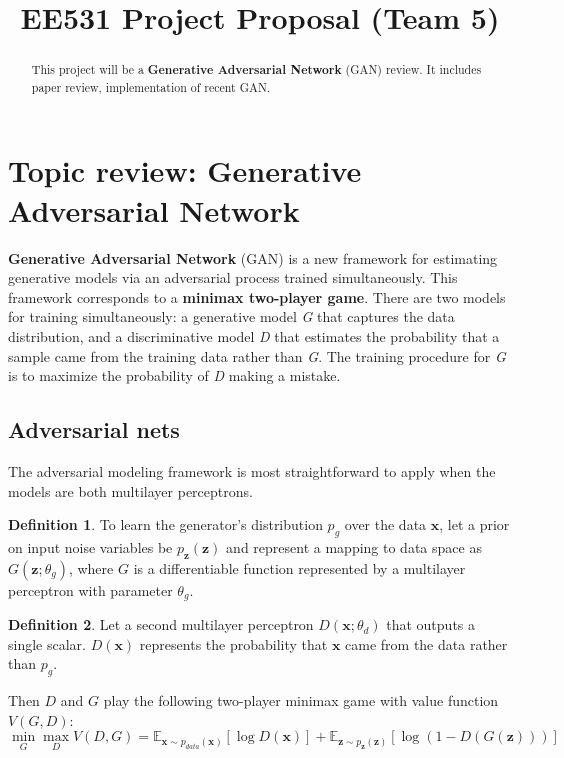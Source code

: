 \documentclass{article} %
\title{EE531 Project Proposal (Team 5)}
\theoremstyle{definition}
\newtheorem{definition}{Definition}
\begin{document}
\maketitle

\begin{abstract}
This project will be a \textbf{Generative Adversarial Network} (GAN) review. It includes paper review, implementation of recent GAN.
\end{abstract}

\section{Topic review: Generative Adversarial Network}
\textbf{Generative Adversarial Network} (GAN) is a new framework \cite{goodfellow2014generative} for estimating generative models via an adversarial process trained simultaneously. This framework corresponds to a \textbf{minimax two-player game}. There are two models for training simultaneously: a generative model \textit{G} that captures the data distribution, and a discriminative model \textit{D} that estimates the probability that a sample came from the training data rather than \textit{G}. The training procedure for \textit{G} is to maximize the probability of \textit{D} making a mistake. 

\subsection{Adversarial nets}

The adversarial modeling framework is most straightforward to apply when the models are both multilayer perceptrons. 

\begin{definition}
To learn the generator's distribution $p_g$ over the data $\textbf{x}$, let a prior on input noise variables be $p_\textbf{z}(\textbf{z})$ and represent a mapping to data space as $G(\textbf{z};\theta_g)$, where $G$ is a differentiable function represented by a multilayer perceptron with parameter $\theta_g$.
\end{definition}

\begin{definition}
Let a second multilayer perceptron $D(\textbf{x};\theta_d)$ that outputs a single scalar. $D(\textbf{x})$ represents the probability that $\textbf{x}$ came from the data rather than $p_g$.
\end{definition}

Then $D$ and $G$ play the following two-player minimax game with value function $V(G,D)$:
\begin{equation}
    \min_G\max_D V(D,G) = \mathbb{E}_{\textbf{x} \sim p_{data}(\textbf{x})}[\log D(\textbf{x})] + \mathbb{E}_{\textbf{z}\sim p_\textbf{z}(\textbf{z})}[\log(1-D(G(\textbf{z})))]
\label{eq:valuefunction}
\end{equation}
\end{document}
